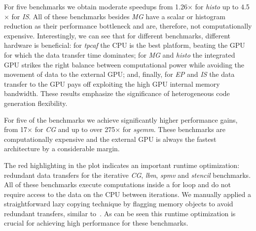 \addtolength{\tabcolsep}{+.25em}

    For five benchmarks we obtain moderate speedups from 1.26$\times$ for
    \emph{histo} up to 4.5$\times$ for \emph{IS}.
    All of these benchmarks besides \emph{MG} have a scalar or histogram
    reduction as their performance bottleneck and are, therefore, not
    computationally expensive.
    Interestingly, we can see that for different benchmarks, different hardware
    is beneficial:
    for \emph{tpcaf}  the CPU is the best platform, beating the GPU  for which
    the data transfer time dominates;
    for \emph{MG} and \emph{histo} the integrated GPU strikes the right balance
    between computational power while avoiding the movement of data to the
    external GPU;
    and, finally, for \emph{EP} and \emph{IS} the data transfer to the GPU pays
    off exploiting the high GPU internal memory bandwidth.
    These results emphasize the significance of heterogeneous code generation
    flexibility.

For five of the benchmarks we achieve significantly higher performance gains, from 17$\times$ for \emph{CG} and up to over 275$\times$ for \emph{sgemm}.
These benchmarks are computationally expensive and the external GPU is always the fastest architecture by a considerable margin.

The red highlighting in the plot indicates an important runtime optimization:
redundant data transfers for the iterative \emph{CG}, \emph{lbm}, \emph{spmv} and \emph{stencil} benchmarks.
All of these benchmarks execute computations inside a for loop and do not require access to the data on the CPU between iterations.
We manually applied a straightforward lazy copying technique by flagging memory objects to avoid redundant transfers, similar to~\cite{jablin11automatic}.
As can be seen this runtime optimization is crucial for achieving high performance for these benchmarks.

